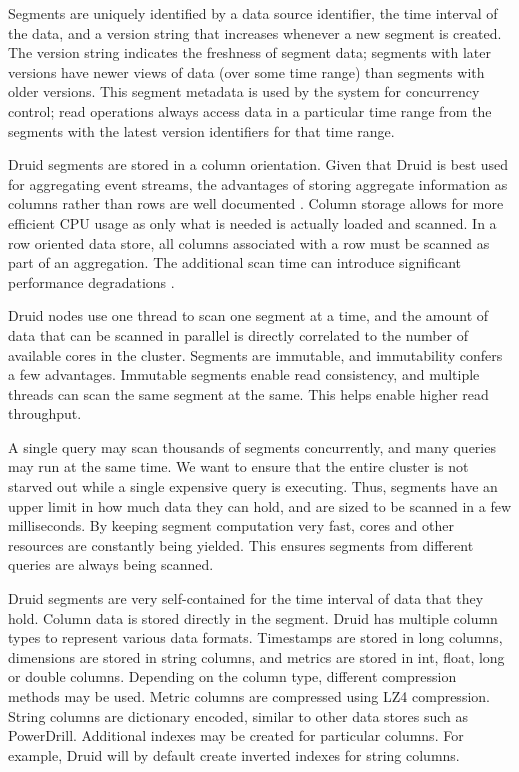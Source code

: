 \documentclass{vldb}
\begin{document}
{Segments are uniquely identified by a data source identifier, the time interval
of the data, and a version string that increases whenever a new segment is
created. The version string indicates the freshness of segment data; segments
with later versions have newer views of data (over some time range) than
segments with older versions. This segment metadata is used by the system for
concurrency control; read operations always access data in a particular time
range from the segments with the latest version identifiers for that time
range.

Druid segments are stored in a column orientation. Given that Druid is best
used for aggregating event streams, the advantages of storing aggregate
information as columns rather than rows are well documented
\cite{abadi2008column}. Column storage allows for more efficient CPU usage as
only what is needed is actually loaded and scanned.  In a row oriented data
store, all columns associated with a row must be scanned as part of an
aggregation. The additional scan time can introduce significant performance
degradations \cite{abadi2008column}.

Druid nodes use one thread to scan one segment at a time, and the amount of
data that can be scanned in parallel is directly correlated to the number of
available cores in the cluster. Segments are immutable, and immutability
confers a few advantages. Immutable segments enable read consistency, and
multiple threads can scan the same segment at the same. This helps enable
higher read throughput. 

A single query may scan thousands of segments concurrently, and
many queries may run at the same time. We want to ensure that the entire
cluster is not starved out while a single expensive query is executing. Thus,
segments have an upper limit in how much data they can hold, and are sized
to be scanned in a few milliseconds. By keeping segment computation very fast,
cores and other resources are constantly being yielded. This ensures segments
from different queries are always being scanned.

Druid segments are very self-contained for the time interval of data that they
hold. Column data is stored directly in the segment. Druid has multiple column
types to represent various data formats. Timestamps are stored in long columns,
dimensions are stored in string columns, and metrics are stored in int, float,
long or double columns. Depending on the column type, different compression
methods may be used. Metric columns are compressed using
LZ4\cite{collet2013lz4} compression. String columns are dictionary encoded,
similar to other data stores such as PowerDrill\cite{hall2012processing}.
Additional indexes may be created for particular columns. For example, Druid
will by default create inverted indexes for string columns.

}
\end{document}
